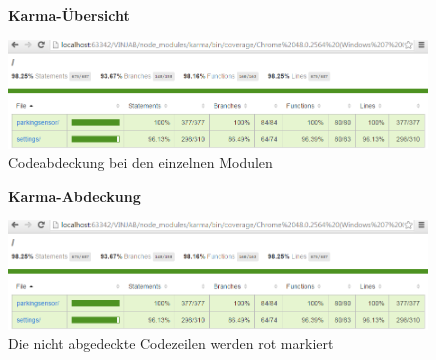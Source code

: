 \documentclass[qualitaetssicherung.tex]{subfiles}
\begin{document}
\begin{itemize}
	\begin{figure}
    \textbf{Karma-Übersicht}\par\medskip
    \includegraphics[width=0.99\textwidth]{Images/karma-example-1.png}
    \caption{Codeabdeckung bei den einzelnen Modulen}
	\end{figure}
	
	\begin{figure}
    \textbf{Karma-Abdeckung}\par\medskip
    \includegraphics[width=0.99\textwidth]{Images/karma-example-1.png}
    \caption{Die nicht abgedeckte Codezeilen werden rot markiert}
	\end{figure}
	

\end{itemize}
		
\end{document}
